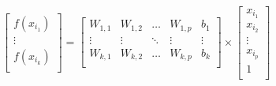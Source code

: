 \documentclass{standalone}
\begin{document}
$
\begin{bmatrix}
f(x_{i_1}) \\ 
\vdots 
\\ 
f(x_{i_k}) \\ 
\end{bmatrix} 
=
\begin{bmatrix} 
W_{1,1} & W_{1,2} & \ldots & W_{1,p} & b_1 \\
\vdots & \vdots & \ddots & \vdots & \vdots \\
W_{k,1} & W_{k,2} &\ldots & W_{k,p} & b_k \\ 
\end{bmatrix}
\times 
\begin{bmatrix} 
x_{i_1} \\ 
x_{i_2} \\ 
\vdots \\  
x_{i_p} \\ 
1 \\ 
\end{bmatrix}
$
\end{document}
